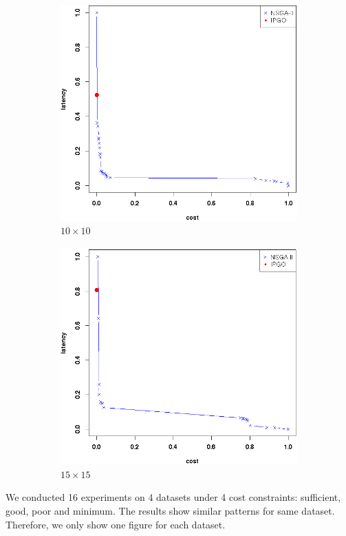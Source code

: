 \documentclass{llncs}
\begin{document}
\begin{figure}[H]
	\begin{subfigure}[b]{0.49\textwidth}
		\includegraphics[width=\textwidth]{pics/124.png}
		\caption{$10 \times 10$}
		\label{fig:10_10}
	\end{subfigure}
	\begin{subfigure}[b]{0.49\textwidth}
		\includegraphics[width=\textwidth]{pics/125.png}
		\caption{$15 \times 15$}
		\label{fig:15_15}
	\end{subfigure}

	\caption{}\label{fig:condition}
\end{figure}
We conducted 16 experiments on 4 datasets under 4 cost constraints: sufficient, good, poor and minimum. The results show similar 
patterns for same dataset. Therefore, we only show one figure for each dataset.
\end{document}
